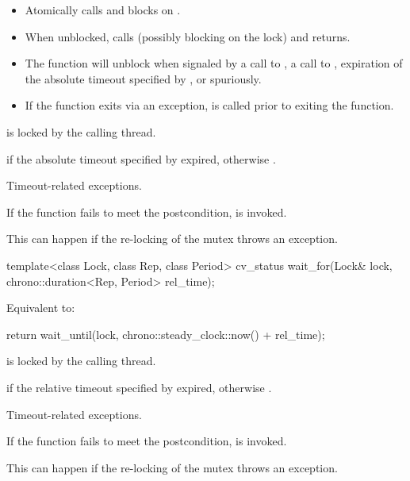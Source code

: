 \begin{itemdescr}
\pnum
\effects

\begin{itemize}
\item
{}%
Atomically calls  and blocks on .

\item
When unblocked, calls  (possibly blocking on the lock) and returns.

\item
The function will unblock when signaled by a call to , a call to ,
expiration of the absolute timeout specified by ,
or spuriously.

\item
If the function exits via an exception,  is called prior to exiting the function.
\end{itemize}

\pnum
\ensures
{} is locked by the calling thread.

\pnum
\returns
{} if
the absolute timeout specified by  expired,
otherwise .

\pnum
\throws
Timeout-related
exceptions.

\pnum
\remarks
If the function fails to meet the postcondition, 
is invoked.
\begin{note}
This can happen if the re-locking of the mutex throws an exception.
\end{note}
\end{itemdescr}

%
\begin{itemdecl}
template<class Lock, class Rep, class Period>
  cv_status wait_for(Lock& lock, chrono::duration<Rep, Period> rel_time);
\end{itemdecl}

\begin{itemdescr}
\pnum
\effects
Equivalent to:
\begin{codeblock}
return wait_until(lock, chrono::steady_clock::now() + rel_time);
\end{codeblock}

\pnum
\ensures
{} is locked by the calling thread.

\pnum
\returns
{} if
the relative timeout specified by  expired,
otherwise .

\pnum
\throws
Timeout-related
exceptions.

\pnum
\remarks
If the function fails to meet the postcondition, 
is invoked.
\begin{note}
This can happen if the re-locking of the mutex throws an exception.
\end{note}
\end{itemdescr}

